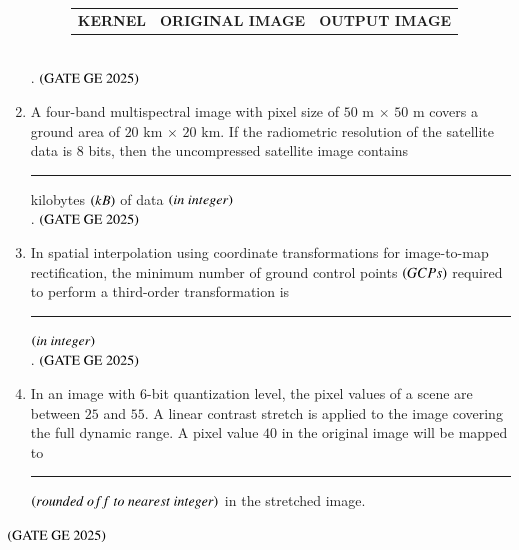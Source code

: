 \documentclass[journal,12pt,onecolumn]{IEEEtran}
\theoremstyle{remark}
\begin{document}
\begin{enumerate}
\begin{figure}[H]
    \begin{tabular}{c c c}
        \hspace{2cm}
        \textbf{KERNEL} & \hspace{1cm} \textbf{ORIGINAL IMAGE} & \hspace{1cm} \textbf{OUTPUT 
IMAGE}
    \end{tabular}
\end{figure}\\.
\hfill $\left(\text{GATE GE 2025}\right)$
\bigskip
\item A four-band multispectral image with pixel size of $50$ m $\times$ $50$ m covers a ground area of $20$ km $\times$ $20$ km.
If the radiometric resolution of the satellite data is $8$ bits, then the uncompressed satellite image contains \rule{2cm}{0.5mm} kilobytes $\left(kB\right)$ of data $\left(in\ integer\right)$\\.
\hfill $\left(\text{GATE GE 2025}\right)$
\bigskip
\item In spatial interpolation using coordinate transformations for image-to-map rectification, the minimum number of ground control points $\left(GCPs\right)$ required to perform a third-order transformation is \rule{2cm}{0.5mm} $\left(in\ integer\right)$\\.
\hfill $\left(\text{GATE GE 2025}\right)$
\bigskip
\item In an image with $6$-bit quantization level, the pixel values of a scene are between $25$ and $55$. A linear contrast stretch is applied to the image covering the full dynamic range.
A pixel value $40$ in the original image will be mapped to \rule{2cm}{0.5mm} $\brak{rounded\ off\ to\ nearest\ integer}$ in the stretched image.
\end{enumerate}
\hfill $\left(\text{GATE GE 2025}\right)$
\bigskip
\end{document}
